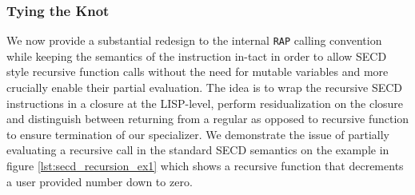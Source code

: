\documentclass[a4paper,12pt,twoside,openright]{report}
\theoremstyle{definition}
\newcommand{\mslang}{$\lambda_{\uparrow\downarrow}$}
\begin{document}




\subsubsection{Tying the Knot}\label{ssubsec:knot}
We now provide a substantial redesign to the internal \texttt{RAP} calling convention while keeping the semantics of the instruction in-tact in order to allow SECD style recursive function calls without the need for mutable variables and more crucially enable their partial evaluation. The idea is to wrap the recursive SECD instructions in a closure at the LISP-level, perform residualization on the closure and distinguish between returning from a regular as opposed to recursive function to ensure termination of our specializer. We demonstrate the issue of partially evaluating a recursive call in the standard SECD semantics on the example in figure \ref{lst:secd_recursion_ex1} which shows a recursive function that decrements a user provided number down to zero.
\end{document}
